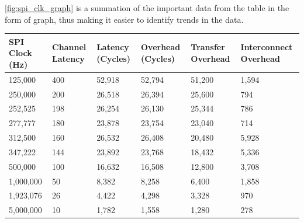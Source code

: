\autoref{fig:spi_clk_graph} is a summation of the important data from the table in the form of graph, thus making it easier to identify trends in the data.

\begin{table}
    \centering
    \begin{threeparttable}
    \begin{tabular}{l|l|l|l|l|l}
    \textbf{SPI Clock (Hz)} & \textbf{Channel Latency} & \textbf{Latency (Cycles)} & \textbf{Overhead (Cycles)} & \textbf{Transfer Overhead} & \textbf{Interconnect Overhead} \\ \hline
     125,000               &  400                 &  52,918              &  52,794              & 51,200                &  1,594                                      \\
     250,000               &  200                 &  26,518              &  26,394              & 25,600                &  794                                        \\
     252,525\tnote{*}      &  198                 &  26,254              &  26,130              & 25,344                &  786                                        \\
     277,777\tnote{*}      &  180                 &  23,878              &  23,754              & 23,040                &  714                                        \\
     312,500               &  160                 &  26,532              &  26,408              & 20,480                &  5,928                                      \\
     347,222\tnote{*}      &  144                 &  23,892              &  23,768              & 18,432                &  5,336                                      \\
     500,000               &  100                 &  16,632              &  16,508              & 12,800                &  3,708                                      \\
     1,000,000             &  50                  &  8,382               &  8,258               & 6,400                 &  1,858                                      \\
     1,923,076\tnote{*}    &  26                  &  4,422               &  4,298               & 3,328                 &  970                                        \\
     5,000,000             &  10                  &  1,782               &  1,558               & 1,280                 &  278                                        \\

\end{tabular}
\end{threeparttable}
\end{table}
